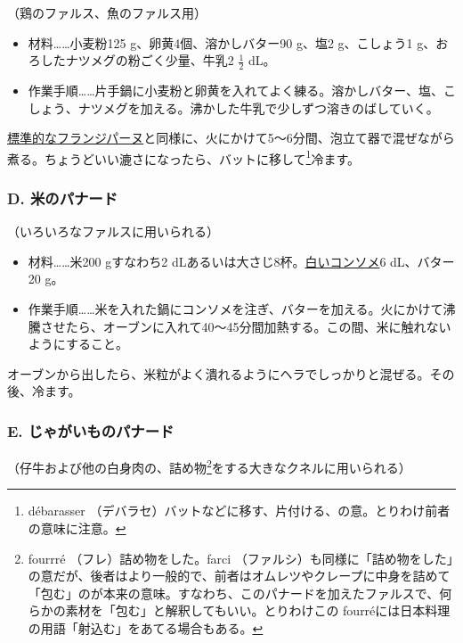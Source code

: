 \begin{recette}
（鶏のファルス、魚のファルス用）

\begin{itemize}
\item
  材料\ldots{}\ldots{}小麦粉125 g、卵黄4個、溶かしバター90 g、塩2
  g、こしょう1 g、おろしたナツメグの粉ごく少量、牛乳2 \(\frac{1}{2}\)
  dL。
\item
  作業手順\ldots{}\ldots{}片手鍋に小麦粉と卵黄を入れてよく練る。溶かしバター、塩、こしょう、ナツメグを加える。沸かした牛乳で少しずつ溶きのばしていく。
\end{itemize}

\protect\hyperlink{creme-frangipane}{標準的なフランジパーヌ}と同様に、火にかけて5〜6分間、泡立て器で混ぜながら煮る。ちょうどいい漉さになったら、バットに移して\footnote{débarasser
  （デバラセ）バットなどに移す、片付ける、の意。とりわけ前者の意味に注意。}冷ます。

\hypertarget{panade-d}{%
\subsubsection{D. 米のパナード}\label{panade-d}}



（いろいろなファルスに用いられる）

\begin{itemize}
\item
  材料\ldots{}\ldots{}米200 gすなわち2
  dLあるいは大さじ8杯。\protect\hyperlink{}{白いコンソメ}6 dL、バター20
  g。
\item
  作業手順\ldots{}\ldots{}米を入れた鍋にコンソメを注ぎ、バターを加える。火にかけて沸騰させたら、オーブンに入れて40〜45分間加熱する。この間、米に触れないようにすること。
\end{itemize}

オーブンから出したら、米粒がよく潰れるようにヘラでしっかりと混ぜる。その後、冷ます。

\hypertarget{panade-e}{%
\subsubsection{E. じゃがいものパナード}\label{panade-e}}



（仔牛および他の白身肉の、詰め物\footnote{fourrré
  （フレ）詰め物をした。farci
  （ファルシ）も同様に「詰め物をした」の意だが、後者はより一般的で、前者はオムレツやクレープに中身を詰めて「包む」のが本来の意味。すなわち、このパナードを加えたファルスで、何らかの素材を「包む」と解釈してもいい。とりわけこの
  fourréには日本料理の用語「射込む」をあてる場合もある。}をする大きなクネルに用いられる）


\end{recette}
